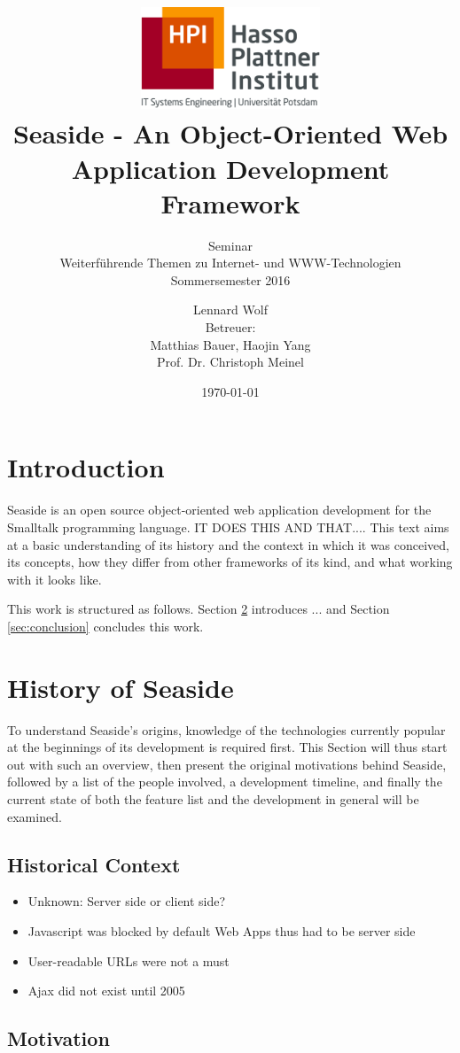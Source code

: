 \documentclass[a4paper,12pt,pagesize,headsepline,bibtotoc,titlepage]{scrartcl}
\title{
	\includegraphics*[width=0.4\textwidth]{hpi_logo.png}\\
	\vspace{24pt}
	 Seaside - An Object-Oriented Web Application Development Framework
}
\subtitle{
	Seminar\\
	Weiterführende Themen zu Internet- und WWW-Technologien\\
	Sommersemester 2016
}
\author{
	Lennard Wolf\\[12pt]
	Betreuer:\\
	Matthias Bauer, Haojin Yang\\
	Prof. Dr. Christoph Meinel
}
\date{\today}
\begin{document}
\maketitle
\tableofcontents
\newpage

\section{Introduction}
Seaside is an open source object-oriented web application development for the Smalltalk programming language. IT DOES THIS AND THAT.... This text aims at a basic understanding of its history and the context in which it was conceived, its concepts, how they differ from other frameworks of its kind, and what working with it looks like. 

This work is structured as follows. Section \ref{sec:history} introduces 
... 
 and Section \ref{sec:conclusion} concludes this work.


\section{History of Seaside}
\label{sec:history}
To understand Seaside's origins, knowledge of the technologies currently popular at the beginnings of its development is required first. This Section will thus start out with such an overview, then present the original motivations behind Seaside, followed by a list of the people involved, a development timeline, and finally the current state of both the feature list and the development in general will be examined.

\subsection{Historical Context}
\label{sec:context} 

\begin{itemize}
\item Unknown: Server side or client side?
\item Javascript was blocked by default Web Apps thus had to be server side
\item User-readable URLs were not a must
\item Ajax did not exist until 2005
\end{itemize}

\subsection{Motivation}
\label{sec:motivation} 
\end{document}
